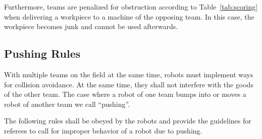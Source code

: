\documentclass[12pt,twoside]{article}
\newcommand{\reftab}[1]{Table~\ref{#1}}
\begin{document}
Furthermore, teams are penalized for obstruction according to
\reftab{tab:scoring} when delivering a workpiece to a machine of the
opposing team.  In this case, the workpiece becomes junk and cannot be
used afterwards.

\subsection{Pushing Rules}
\label{sec:pushing-rules}

With multiple teams on the field at the same time, robots must
implement ways for collision avoidance. At the same time, they shall
not interfere with the goods of the other team. The case where a robot
of one team bumps into or moves a robot of another team we
call ``pushing''.

The following rules shall be obeyed by the robots and provide the
guidelines for referees to call for improper behavior of a robot due
to pushing.
\end{document}
